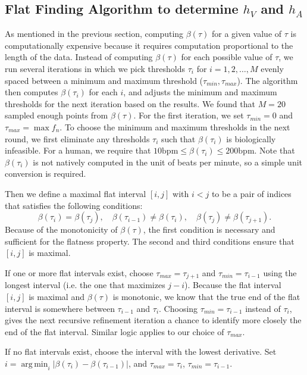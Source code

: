 \documentclass[conference]{IEEEtran}
\newcommand{\APH}{\ensuremath{h_A}}
\newcommand{\VPH}{\ensuremath{h_V}}
\DeclareMathOperator*{\argmin}{arg\,min}
\begin{document}
\subsection{Flat Finding Algorithm to determine \VPH{} and \APH{}}
As mentioned in the previous section, computing $\beta(\tau)$ for a given value of $\tau$
is computationally expensive because it requires computation proportional to the length of the data.
Instead of computing $\beta(\tau)$ for each possible value of $\tau$, we run several iterations in which
we pick thresholds $\tau_i$ for $i = 1, 2, \dots, M$ evenly spaced
between a minimum and maximum threshold ($\tau_{min}, \tau_{max}$).  The algorithm then computes
$\beta(\tau_i)$ for each $i$, and adjusts the minimum and
maximum thresholds for the next iteration based on the
results.
We found that $M=20$ sampled enough points from $\beta(\tau)$.
For the first iteration, we set
$\tau_{min} = 0$ and $\tau_{max} = \max f_n$. 
To choose the minimum and maximum thresholds in
the next round, we first eliminate any thresholds $\tau_i$
such that $\beta(\tau_i)$ is biologically infeasible. 
For a human, we require that $10 \text{bpm} \le \beta(\tau_i) \le 200 \text{bpm}$.
Note that $\beta(\tau_i)$ is not natively computed in the unit of beats per minute, so a simple unit conversion is required.

Then we define a maximal flat interval $[i,j]$ with $i<j$ to be a pair of indices that satisfies the following conditions:
\begin{equation*}
	\beta(\tau_i) = \beta(\tau_j),\quad \beta(\tau_{i-1}) \ne \beta(\tau_i),\quad \beta(\tau_j) \ne \beta(\tau_{j+1}).
\end{equation*}
Because of the monotonicity of $\beta(\tau)$, the first condition is necessary and sufficient for the flatness property.
The second and third conditions ensure that $[i,j]$ is maximal.

If one or more flat intervals exist, choose $\tau_{max} = \tau_{j+1}$ and $\tau_{min}=\tau_{i-1}$ using the longest interval (i.e. the one that maximizes $j-i$).
Because the flat interval $[i,j]$ is maximal and $\beta(\tau)$ is monotonic,
we know that the true end of the flat interval is somewhere between $\tau_{i-1}$ and $\tau_i$. 
Choosing $\tau_{min} = \tau_{i-1}$ instead of $\tau_{i}$, gives the next recursive refinement iteration a chance to identify more closely the end of the flat interval.
Similar logic applies to our choice of $\tau_{max}$.

If no flat intervals exist, choose the interval with the lowest derivative.
Set $i=\argmin_{i} |\beta(\tau_i) - \beta(\tau_{i-1})|$, and  $\tau_{max} = \tau_i$, $\tau_{min} = \tau_{i-1}$.
\end{document}
